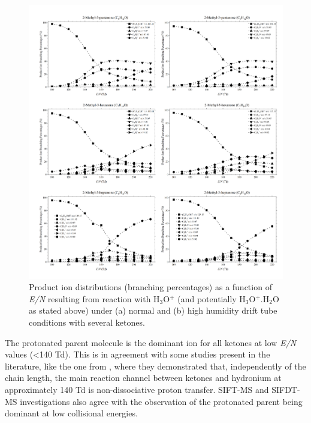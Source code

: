 \begin{figure}\ContinuedFloat
\centering
\includegraphics[width=1\textwidth]{pics/ketones/plot_6.png}
\captionsetup{list=yes}
\caption{Product ion distributions (branching percentages) as a function of \textit{E/N} resulting from reaction with H$_{3}$O$^+$ (and potentially H$_{3}$O$^+$.H$_{2}$O as stated above)
under (a) normal and (b) high humidity drift tube conditions with several ketones.}
\label{fig:ke_fig2}
\end{figure}

The protonated parent molecule is the dominant ion for all ketones at  low \textit{E/N} values (<140 Td).
This is in agreement with some studies present in the literature, like the one from \citeauthor{buhr2002analysis}, where they demonstrated that, independently of the chain length, the main reaction channel between ketones and hydronium at approximately 140 Td is non-dissociative proton transfer.
SIFT-MS \cite{vspanvel1997sift,smith2003analysis,smith2019} and SIFDT-MS \cite{spesyvyi2017ion} investigations also agree with the observation of the protonated parent being dominant at low collisional energies.



